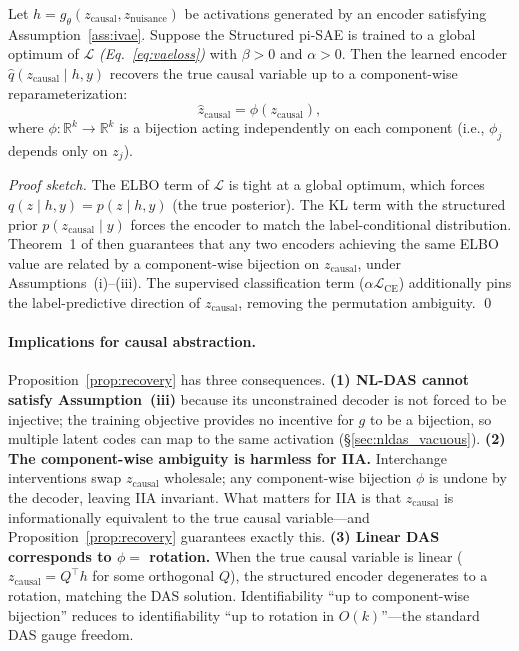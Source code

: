 \begin{proposition}
\label{prop:recovery}
Let $h = g_\theta(z_\text{causal}, z_\text{nuisance})$ be activations
generated by an encoder satisfying Assumption~\ref{ass:ivae}.  Suppose the
Structured pi-SAE is trained to a global optimum of
$\mathcal{L}$ \emph{(Eq.~\ref{eq:vaeloss})} with $\beta > 0$ and $\alpha > 0$.
Then the learned encoder $\hat{q}(z_\text{causal} \mid h, y)$ recovers the
true causal variable up to a component-wise reparameterization:
\[
  \hat{z}_\text{causal} = \phi(z_\text{causal}),
\]
where $\phi: \mathbb{R}^k \to \mathbb{R}^k$ is a bijection acting
independently on each component (i.e., $\phi_j$ depends only on
$z_j$).
\end{proposition}

\begin{proof}[Proof sketch]
The ELBO term of $\mathcal{L}$ is tight at a global optimum, which forces
$q(z \mid h, y) = p(z \mid h, y)$ (the true posterior).  The KL term with
the structured prior $p(z_\text{causal} \mid y)$ forces the
encoder to match the label-conditional distribution.  Theorem~1 of
\citet{khemakhem2020variational} then guarantees that any two encoders
achieving the same ELBO value are related by a component-wise bijection on
$z_\text{causal}$, under Assumptions~(i)--(iii).  The supervised
classification term ($\alpha \mathcal{L}_\text{CE}$) additionally pins the
label-predictive direction of $z_\text{causal}$, removing the
permutation ambiguity. \qed
\end{proof}

\paragraph{Implications for causal abstraction.}
Proposition~\ref{prop:recovery} has three consequences.
\textbf{(1) NL-DAS cannot satisfy Assumption~(iii)} because its
unconstrained decoder is not forced to be injective; the training objective
provides no incentive for $g$ to be a bijection, so multiple latent codes
can map to the same activation (\S\ref{sec:nldas_vacuous}).
\textbf{(2) The component-wise ambiguity is harmless for IIA.}
Interchange interventions swap $z_\text{causal}$ wholesale; any
component-wise bijection $\phi$ is undone by the decoder, leaving IIA
invariant.  What matters for IIA is that $z_\text{causal}$ is
informationally equivalent to the true causal variable---and
Proposition~\ref{prop:recovery} guarantees exactly this.
\textbf{(3) Linear DAS corresponds to $\phi = $ rotation.}  When the true
causal variable is linear ($z_\text{causal} = Q^\top h$ for some orthogonal
$Q$), the structured encoder degenerates to a rotation, matching the DAS
solution.  Identifiability ``up to component-wise bijection'' reduces to
identifiability ``up to rotation in $O(k)$''---the standard DAS gauge
freedom.

